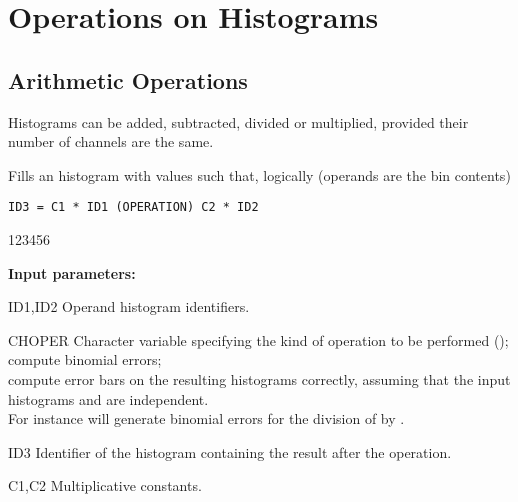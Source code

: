  
\chapter{Operations on Histograms}
\label{HOPERFIT}

\section{Arithmetic Operations}
\label{HARITHME}

Histograms can be added, subtracted, divided or multiplied, provided
their number of channels are the same.
 
 
\Action
Fills an histogram  with values such that,
logically (operands are the bin contents)
 
\begin{verbatim}
ID3 = C1 * ID1 (OPERATION) C2 * ID2
\end{verbatim}
 
\begin{DLtt}{123456}
\item[{\rm\bf Input parameters:}]
\item[ID1,ID2] Operand histogram identifiers.
\item[CHOPER] Character variable specifying the
     kind of operation to be performed
     (\Lit{+,-,*,/});\\
      compute binomial errors;\\
      compute error bars on the resulting
      histograms correctly, assuming that the
      input histograms  and  are independent.\\
     For instance  will generate binomial errors for the
     division of  by .
\item[ID3] Identifier of the histogram containing
the result after the operation.
\item[C1,C2] Multiplicative constants.
\end{DLtt}

